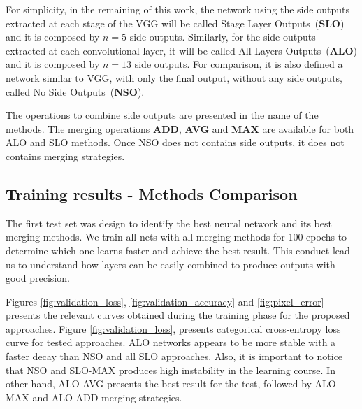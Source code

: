 For simplicity, in the remaining of this work, the network using the side outputs extracted at each stage of the VGG will be called Stage Layer Outputs~(\textbf{SLO}) and it is composed by $n=5$ side outputs. Similarly, for the side outputs extracted at each convolutional layer, it will be called All Layers Outputs~(\textbf{ALO}) and it is composed by $n=13$ side outputs. For comparison, it is also defined a network similar to VGG, with only the final output, without any side outputs, called No Side Outputs~(\textbf{NSO}).

The operations to combine side outputs are presented in the name of the methods. The merging operations \textbf{ADD}, \textbf{AVG} and \textbf{MAX} are available for both ALO and SLO methods. Once NSO does not contains side outputs, it does not contains merging strategies.

\subsection{Training results - Methods Comparison}

The first test set was design to identify the best neural network and its best merging methods. We train all nets with all merging methods for 100 epochs to determine which one learns faster and achieve the best result. This conduct lead us to understand how layers can be easily combined to produce outputs with good precision.

Figures \ref{fig:validation_loss}, \ref{fig:validation_accuracy} and \ref{fig:pixel_error} presents the relevant curves obtained during the training phase for the proposed approaches. 
Figure \ref{fig:validation_loss}, presents categorical cross-entropy loss curve for tested approaches. ALO networks appears to be more stable with a faster decay than NSO and all SLO approaches. Also, it is important to notice that NSO and SLO-MAX produces high instability in the learning course. In other hand, ALO-AVG presents the best result for the test, followed by ALO-MAX and ALO-ADD merging strategies.

